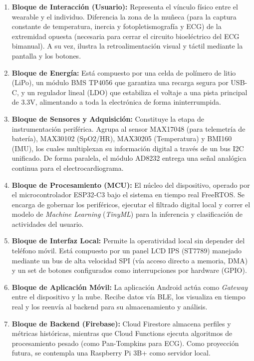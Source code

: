 \documentclass[letterpaper,11pt]{article}
\begin{document}
\begin{enumerate}
    \item \textbf{Bloque de Interacción (Usuario):} Representa el vínculo físico entre el wearable y el individuo. Diferencia la zona de la muñeca (para la captura constante de temperatura, inercia y fotopletismografía y ECG) de la extremidad opuesta (necesaria para cerrar el circuito bioeléctrico del ECG bimanual). A su vez, ilustra la retroalimentación visual y táctil mediante la pantalla y los botones.
    \item \textbf{Bloque de Energía:} Está compuesto por una celda de polímero de litio (LiPo), un módulo BMS TP4056 que garantiza una recarga segura por USB-C, y un regulador lineal (LDO) que estabiliza el voltaje a una pista principal de 3.3V, alimentando a toda la electrónica de forma ininterrumpida.
    \item \textbf{Bloque de Sensores y Adquisición:} Constituye la etapa de instrumentación periférica. Agrupa al sensor MAX17048 (para telemetría de batería), MAX30102 (SpO2/HR), MAX30205 (Temperatura) y BMI160 (IMU), los cuales multiplexan su información digital a través de un bus I2C unificado. De forma paralela, el módulo AD8232 entrega una señal analógica continua para el electrocardiograma.
    \item \textbf{Bloque de Procesamiento (MCU):} El núcleo del dispositivo, operado por el microcontrolador ESP32-C3 bajo el sistema en tiempo real FreeRTOS. Se encarga de gobernar los periféricos, ejecutar el filtrado digital local y correr el modelo de \textit{Machine Learning} (\textit{TinyML}) para la inferencia y clasificación de actividades del usuario.
    \item \textbf{Bloque de Interfaz Local:} Permite la operatividad local sin depender del teléfono móvil. Está compuesto por un panel LCD IPS (ST7789) manejado mediante un bus de alta velocidad SPI (vía acceso directo a memoria, DMA) y un set de botones configurados como interrupciones por hardware (GPIO).
    \item \textbf{Bloque de Aplicación Móvil:} La aplicación Android actúa como \textit{Gateway} entre el dispositivo y la nube. Recibe datos vía BLE, los visualiza en tiempo real y los reenvía al backend para su almacenamiento y análisis.
    \item \textbf{Bloque de Backend (Firebase):} Cloud Firestore almacena perfiles y métricas históricas, mientras que Cloud Functions ejecuta algoritmos de procesamiento pesado (como Pan-Tompkins para ECG). Como proyección futura, se contempla una Raspberry Pi 3B+ como servidor local.
\end{enumerate}
\end{document}
